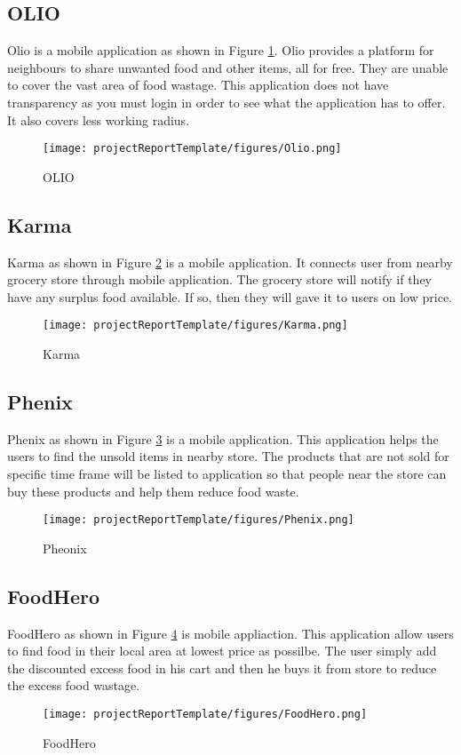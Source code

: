 \newpage
\subsection{OLIO}
Olio \cite{ref6} is a mobile application as shown in Figure \ref{fig olio}. Olio provides a platform for neighbours to share unwanted food and other items, all for free. They are unable to cover the vast area of food wastage. This application does not have transparency as you must login in order to see what the application has to offer. It also covers less working radius.\\
\begin{figure}[!h]
    \centering
    \texttt{[image: projectReportTemplate/figures/Olio.png]}
    \caption{OLIO}
    \label{fig olio}
\end{figure}
\newpage
\subsection{Karma}
Karma \cite{ref7} as shown in Figure \ref{fig karma} is a mobile application. It connects user from nearby grocery store through mobile application. The grocery store will notify if they have any surplus food available. If so, then they will gave it to users on low price.\\
\begin{figure}[!h]
    \centering
    \texttt{[image: projectReportTemplate/figures/Karma.png]}
    \caption{Karma}
    \label{fig karma}
\end{figure}
\newpage
\subsection{Phenix}
Phenix as shown in Figure \ref{fig pheoinx} is a mobile application. This application helps the users to find the unsold items in nearby store. The products that are not sold for specific time frame will be listed to application so that people near the store can buy these products and help them reduce food waste.\\
\begin{figure}[!h]
    \centering
    \texttt{[image: projectReportTemplate/figures/Phenix.png]}
    \caption{Pheonix}
    \label{fig pheoinx}
\end{figure}
\newpage
\subsection{FoodHero}
FoodHero \cite{ref8} as shown in Figure \ref{fig:Foodhero} is mobile appliaction. This application allow users to find food in their local area at lowest price as possilbe. The user simply add the discounted excess food in his cart and then he buys it from store to reduce the excess food wastage.\\
\begin{figure}[!h]
    \centering
    \texttt{[image: projectReportTemplate/figures/FoodHero.png]}
    \caption{FoodHero }
    \label{fig:Foodhero}
\end{figure}
\newpage
